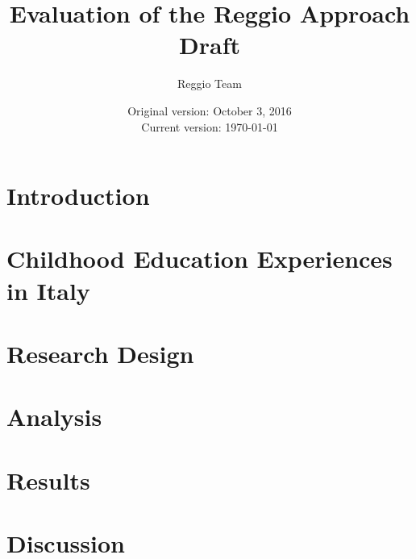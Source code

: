 






\title{\Large \textbf{Evaluation of the Reggio Approach} \\ Draft}
\author{\normalsize Reggio Team}
\date{\normalsize Original version: October 3, 2016 \\ Current version: \today}
\maketitle

\tableofcontents

\clearpage
\doublespacing

\section{Introduction}
\label{sec:introduction}


\section{Childhood Education Experiences in Italy}
\label{sec:ece-italy}


\section{Research Design}
\label{sec:data}




\section{Analysis}
\label{sec:methodology}
%


\section{Results}
\label{sec:result}

\clearpage

\section{Discussion}
\label{sec:discussion}


\clearpage






